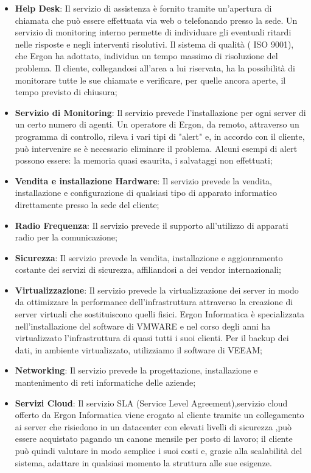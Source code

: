 \begin{itemize}
	\item \textbf{Help Desk}: Il servizio di assistenza è fornito tramite un'apertura di chiamata che può essere effettuata via web o telefonando presso la sede.
	Un servizio di monitoring  interno permette di individuare gli eventuali ritardi nelle risposte e negli interventi risolutivi. Il sistema di qualità ( ISO 9001), che Ergon ha adottato, individua un tempo massimo di risoluzione del problema.
	Il cliente, collegandosi all'area a lui riservata, ha la possibilità di monitorare tutte le sue chiamate e verificare, per quelle ancora aperte, il tempo  previsto di chiusura;
	
	\item \textbf{Servizio di Monitoring}: Il servizio prevede l'installazione per ogni server di un certo numero di agenti.
	Un operatore di Ergon, da remoto, attraverso un programma di controllo, rileva i vari tipi di "alert" e, in accordo con il cliente,  può intervenire se è necessario eliminare il problema. Alcuni esempi di alert possono essere: la memoria quasi esaurita, i salvataggi non effettuati;
	
	\item \textbf{Vendita e installazione Hardware}: Il servizio prevede la vendita, installazione e configurazione di qualsiasi tipo di apparato informatico direttamente presso la sede del cliente;
	
	\item \textbf{Radio Frequenza}: Il servizio prevede il supporto all'utilizzo di apparati radio per la comunicazione;
	
	\item \textbf{Sicurezza}: Il servizio prevede la vendita, installazione e aggionramento costante dei servizi di sicurezza, affiliandosi a dei vendor internazionali;
	
	\item \textbf{Virtualizzazione}: Il servizio prevede la virtualizzazione dei server in modo da ottimizzare la performance dell'infrastruttura attraverso la creazione di server virtuali che sostituiscono quelli fisici. Ergon Informatica è specializzata nell'installazione del software di VMWARE e nel corso degli anni ha virtualizzato l'infrastruttura di quasi tutti i suoi clienti.
	Per il backup dei dati,  in ambiente virtualizzato, utilizziamo il software di VEEAM;
	
	\item \textbf{Networking}: Il servizio prevede la progettazione, installazione e mantenimento di reti informatiche delle aziende;
	
	\item \textbf{Servizi Cloud}: Il servizio SLA (Service Level Agreement),servizio cloud offerto da Ergon Informatica viene erogato al cliente tramite un collegamento ai server che risiedono in un datacenter con elevati livelli di sicurezza  ,può essere acquistato pagando un canone mensile per posto di lavoro; il cliente può quindi valutare in modo semplice i suoi costi e, grazie alla scalabilità del sistema, adattare in qualsiasi momento la struttura alle sue esigenze.
\end{itemize}

